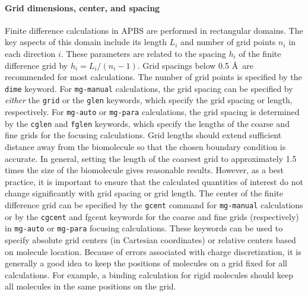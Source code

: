 \documentclass[12pt,titlepage]{article}
\newcommand{\keyword}[1]{\texttt{#1}}
\begin{document}
\paragraph{Grid dimensions, center, and spacing}
Finite difference calculations in APBS are performed in rectangular domains.  
The key aspects of this domain include its length $L_i$ and number of grid points $n_i$ in each direction $i$.
These parameters are related to the spacing $h_i$ of the finite difference grid by $h_i = L_i/(n_i-1)$.
Grid spacings below 0.5 \AA\ are recommended for most calculations.
The number of grid points is specified by the \keyword{dime} keyword.
For \keyword{mg-manual} calculations, the grid spacing can be specified by \emph{either} the \keyword{grid} or the \keyword{glen} keywords, which specify the grid spacing or length, respectively.
For \keyword{mg-auto} or \keyword{mg-para} calculations, the grid spacing is determined by the \keyword{cglen} and \keyword{fglen} keywords, which specify the lengths of the coarse and fine grids for the focusing calculations.
Grid lengths should extend sufficient distance away from the biomolecule so that the chosen boundary condition is accurate. 
In general, setting the length of the coarsest grid to approximately 1.5 times the size of the biomolecule gives reasonable results.
However, as a best practice, it is important to ensure that the calculated quantities of interest do not change significantly with grid spacing or grid length.
The center of the finite difference grid can be specified by the \keyword{gcent} command for \keyword{mg-manual} calculations or by the \keyword{cgcent} and {fgcent} keywords for the coarse and fine grids (respectively) in \keyword{mg-auto} or \keyword{mg-para} focusing calculations.
These keywords can be used to specify absolute grid centers (in Cartesian coordinates) or relative centers based on molecule location.
Because of errors associated with charge discretization, it is generally a good idea to keep the positions of molecules on a grid fixed for all calculations.
For example, a binding calculation for rigid molecules should keep all molecules in the same positions on the grid.
\end{document}
